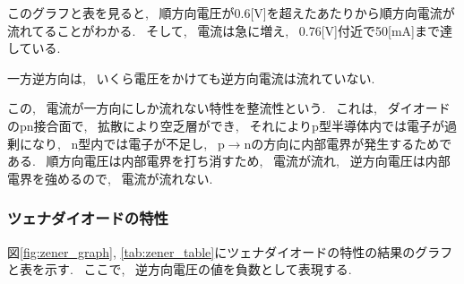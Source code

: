 \documentclass[uplatex,dvipdfmx,a4paper,js=standard, titlepage]{bxjsarticle}
\begin{document}
            このグラフと表を見ると, ~順方向電圧が0.6[V]を超えたあたりから順方向電流が流れてることがわかる.
            ~そして, ~電流は急に増え, ~0.76[V]付近で50[mA]まで達している.

            一方逆方向は, ~いくら電圧をかけても逆方向電流は流れていない.

            この, ~電流が一方向にしか流れない特性を整流性という.
            ~これは, ~ダイオードのpn接合面で, ~拡散により空乏層ができ,
            ~それによりp型半導体内では電子が過剰になり, ~n型内では電子が不足し,
            ~p$\to$nの方向に内部電界が発生するためである.
            ~順方向電圧は内部電界を打ち消すため, ~電流が流れ, ~逆方向電圧は内部電界を強めるので,
            ~電流が流れない.
        \subsubsection{ツェナダイオードの特性}
            図\ref{fig:zener_graph}, \ref{tab:zener_table}にツェナダイオードの特性の結果のグラフと表を示す.
            ~ここで, ~逆方向電圧の値を負数として表現する.
\end{document}
